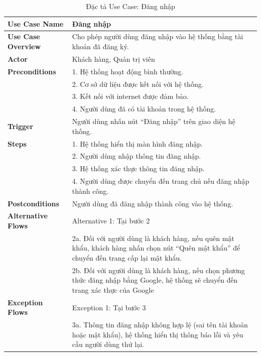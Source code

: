 {\begin{longtable}{|>{\bfseries}p{4cm}|p{11.5cm}|}
\caption{Đặc tả Use Case: Đăng nhập}
\label{tab:uc-login} \\
\hline
\textbf{Use Case Name} & Đăng nhập \\
\hline
\textbf{Use Case Overview} & Cho phép người dùng đăng nhập vào hệ thống bằng tài khoản đã đăng ký. \\
\hline
\textbf{Actor} & Khách hàng, Quản trị viên \\
\hline
\textbf{Preconditions} & 1. Hệ thống hoạt động bình thường. \\
& 2. Cơ sở dữ liệu được kết nối với hệ thống. \\
& 3. Kết nối với internet được đảm bảo. \\
& 4. Người dùng đã có tài khoản trong hệ thống.\\
\hline
\textbf{Trigger} & Người dùng nhấn nút “Đăng nhập” trên giao diện hệ thống. \\
\hline
\textbf{Steps} & 1. Hệ thống hiển thị màn hình đăng nhập. \\
& 2. Người dùng nhập thông tin đăng nhập. \\
& 3. Hệ thống xác thực thông tin đăng nhập. \\
& 4. Người dùng được chuyển đến trang chủ nếu đăng nhập thành công. \\
\hline
\textbf{Postconditions} & Người dùng đã đăng nhập thành công vào hệ thống. \\
\hline
\textbf{Alternative Flows} & Alternative 1: Tại bước 2 \\
& 2a. Đối với người dùng là khách hàng, nếu quên mật khẩu, khách hàng nhấn chọn nút “Quên mật khẩu” để chuyển đến trang cấp lại mật khẩu. \\
& 2b. Đối với người dùng là khách hàng, nếu chọn phương thức đăng nhập bằng Google, hệ thống sẽ chuyển đến trang xác thực của Google\\
\hline
\textbf{Exception Flows} & Exception 1: Tại bước 3 \\
& 3a. Thông tin đăng nhập không hợp lệ (sai tên tài khoản hoặc mật khẩu), hệ thống hiển thị thông báo lỗi và yêu cầu người dùng thử lại. \\
\hline
\end{longtable}

}
